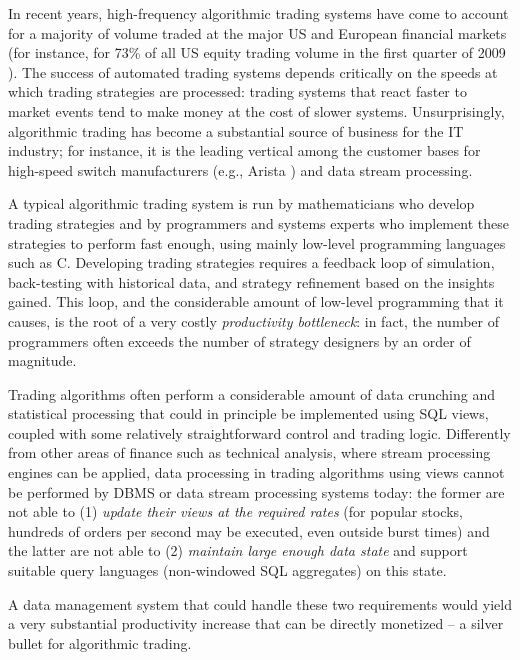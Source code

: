 \label{sec:intro}

In recent years, high-frequency algorithmic trading systems have come to account for a majority
of volume traded at the major US and European financial markets (for instance,
for 73\% of all US equity trading volume in the first quarter of 2009
\cite{Iati2009}). The success of automated trading systems depends critically on
the speeds at which trading strategies are processed: trading systems that react faster to market events
tend to make money at the cost of slower systems. Unsurprisingly, algorithmic
trading has become a substantial source of business for the IT industry; for
instance, it is the leading vertical among the customer bases for high-speed
switch manufacturers (e.g., Arista \cite{Becht2010}) and data stream processing.




A typical algorithmic trading system is run by mathematicians who develop
trading strategies and by programmers and systems experts who implement these
strategies to perform fast enough, using mainly low-level programming languages
such as C. Developing trading strategies requires a feedback loop of simulation,
back-testing with historical data, and strategy refinement based on the insights
gained. This loop, and the considerable amount of low-level programming that it
causes, is the root of a very costly {\em productivity bottleneck}\/: in fact,
the number of programmers often exceeds the number of strategy designers by
an order of magnitude.


Trading algorithms often perform a considerable amount of data crunching
and statistical processing that could in principle be implemented using SQL
views, coupled with some relatively straightforward control and trading logic.
%
Differently from other areas of finance such as technical analysis,
where stream processing engines
\cite{motwani-cidr:03,borealis-design:05} can be applied,
data processing in trading algorithms using views cannot be performed by DBMS or
data stream processing systems today: the former are not able to (1) {\em update
their views at the required rates}\/ (for popular stocks, hundreds of orders per
second may be executed, even outside burst times) and the latter are not able to
(2) {\em maintain large enough data state}\/ and support suitable query
languages (non-windowed SQL aggregates) on this state.

%
A data management system that could handle these two requirements would yield a
very substantial productivity increase that can be directly monetized --
a silver bullet for algorithmic trading.



